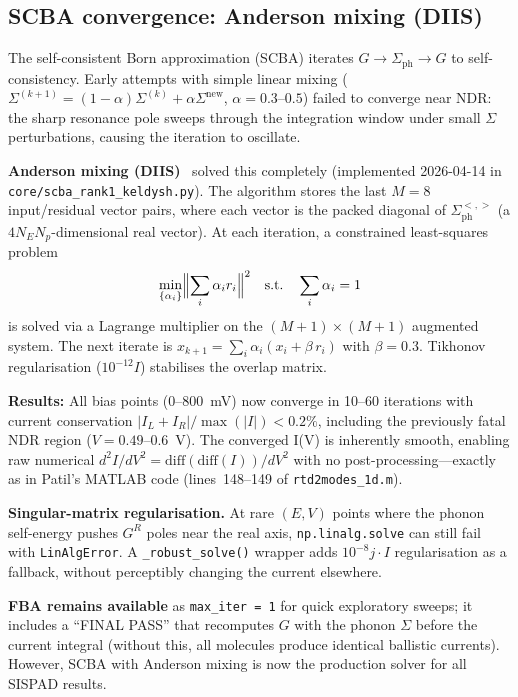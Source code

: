 \documentclass[11pt,a4paper,onecolumn]{article}
\newcommand{\code}[1]{\texttt{\small #1}}
\begin{document}
\subsection{SCBA convergence: Anderson mixing (DIIS)}
\label{sec:fba-vs-scba}
The self-consistent Born approximation (SCBA) iterates
$G \to \Sigma_{\mathrm{ph}} \to G$ to self-consistency.
Early attempts with simple linear mixing ($\Sigma^{(k+1)} = (1-\alpha)\Sigma^{(k)} + \alpha\Sigma^{\mathrm{new}}$,
$\alpha = 0.3$--$0.5$) failed to converge near NDR:
the sharp resonance pole sweeps through the integration window under small
$\Sigma$ perturbations, causing the iteration to oscillate.

\textbf{Anderson mixing (DIIS)}~\cite{anderson1965} solved this completely
(implemented 2026-04-14 in \code{core/scba\_rank1\_keldysh.py}). The algorithm stores
the last $M = 8$ input/residual vector pairs, where each vector is the
packed diagonal of $\Sigma^{<,>}_{\mathrm{ph}}$ (a $4 N_E N_p$-dimensional
real vector). At each iteration, a constrained least-squares problem
\begin{equation}
\min_{\{\alpha_i\}} \Bigl\|\sum_i \alpha_i r_i\Bigr\|^2 \quad \text{s.t.} \quad \sum_i \alpha_i = 1
\end{equation}
is solved via a Lagrange multiplier on the $(M\!+\!1) \times (M\!+\!1)$
augmented system. The next iterate is
$x_{k+1} = \sum_i \alpha_i (x_i + \beta\, r_i)$ with $\beta = 0.3$.
Tikhonov regularisation ($10^{-12} I$) stabilises the overlap matrix.

\textbf{Results:} All bias points (0--800~mV) now converge in 10--60
iterations with current conservation $|I_L + I_R|/\max(|I|) < 0.2\%$,
including the previously fatal NDR region ($V = 0.49$--$0.6$~V). The
converged I(V) is inherently smooth, enabling raw numerical
$d^2I/dV^2 = \mathrm{diff}(\mathrm{diff}(I))/dV^2$ with no post-processing---exactly
as in Patil's MATLAB code (lines~148--149 of \code{rtd2modes\_1d.m}).

\textbf{Singular-matrix regularisation.} At rare $(E,V)$ points where the
phonon self-energy pushes $G^R$ poles near the real axis,
\code{np.linalg.solve} can still fail with \code{LinAlgError}. A
\code{\_robust\_solve()} wrapper adds $10^{-8}j \cdot I$ regularisation as
a fallback, without perceptibly changing the current elsewhere.

\textbf{FBA remains available} as \code{max\_iter = 1} for quick
exploratory sweeps; it includes a ``FINAL PASS'' that recomputes $G$ with
the phonon $\Sigma$ before the current integral (without this, all
molecules produce identical ballistic currents). However, SCBA with
Anderson mixing is now the production solver for all SISPAD results.
\end{document}
